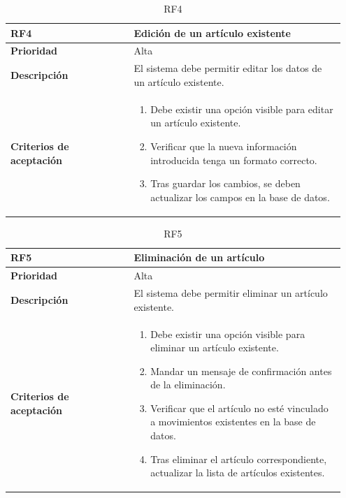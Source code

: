 \begin{table}[htb!]
	\centering %
	\begin{tabular}{|p{0.35\linewidth}|p{0.6\linewidth}|}
		\hline
		\rowcolor{grayshade} \textbf{RF4} & \textbf{Edición de un artículo existente} \\
		\hline
		\textbf{Prioridad} & Alta \\
		\hline
		\textbf{Descripción} & El sistema debe permitir editar los datos de un artículo existente.\\
		\hline
		\vspace{0.5mm}
		\textbf{Criterios de aceptación} & 
		\begin{minipage}[t]{0.9\linewidth}
			\begin{enumerate}
				\item Debe existir una opción visible para editar un artículo existente.
				\item Verificar que la nueva información introducida tenga un formato correcto.
				\item Tras guardar los cambios, se deben actualizar los campos en la base de datos. 
			\end{enumerate}
			\vspace{2mm}
		\end{minipage} \\
		\hline
	\end{tabular}
	\caption{RF4}
\end{table}

\begin{table}[htb!]
	\centering %
	\begin{tabular}{|p{0.35\linewidth}|p{0.6\linewidth}|}
		\hline
		\rowcolor{grayshade} \textbf{RF5} & \textbf{Eliminación de un artículo} \\
		\hline
		\textbf{Prioridad} & Alta \\
		\hline
		\textbf{Descripción} & El sistema debe permitir eliminar un artículo existente.\\
		\hline
		\vspace{0.5mm}
		\textbf{Criterios de aceptación} & 
		\begin{minipage}[t]{0.9\linewidth}
			\begin{enumerate}
				\item Debe existir una opción visible para eliminar un artículo existente.
				\item Mandar un mensaje de confirmación antes de la eliminación. 
				\item Verificar que el artículo no esté vinculado a movimientos existentes en la base de datos.
				\item Tras eliminar el artículo correspondiente, actualizar la lista de artículos existentes. 
			\end{enumerate}
			\vspace{2mm}
		\end{minipage} \\
		\hline
	\end{tabular}
	\caption{RF5}
\end{table}

